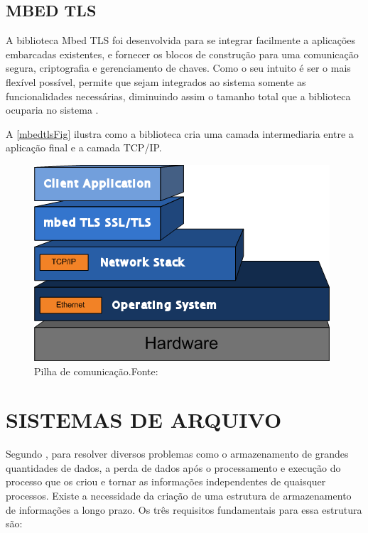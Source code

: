 \subsection{MBED TLS}
A biblioteca Mbed TLS foi desenvolvida para se integrar facilmente a aplicações embarcadas existentes, e fornecer os blocos de construção para uma comunicação segura, criptografia e gerenciamento de chaves. Como o seu intuito é ser o mais flexível possível, permite que sejam integrados ao sistema somente as funcionalidades necessárias, diminuindo assim o tamanho total que a biblioteca ocuparia no sistema \cite{mbedtls}.

A \autoref{mbedtlsFig} ilustra como a biblioteca cria uma camada intermediaria entre a aplicação final e a camada TCP/IP.

\begin{figure}[H]
    \scriptsize
     \centering
     \includegraphics[scale=1]{dados/figuras/mbedtls.png}
     \caption{Pilha de comunicação.\newline Fonte:\cite{mbedtls}}
     \label{mbedtlsFig}
\end{figure}



\section{SISTEMAS DE ARQUIVO}
Segundo , para resolver diversos problemas como o armazenamento de grandes quantidades de dados, a perda de dados após o processamento e execução do processo que os criou e tornar as informações independentes de quaisquer processos. Existe a necessidade da criação de uma estrutura de armazenamento de informações a longo prazo. Os três requisitos fundamentais para essa estrutura são:

